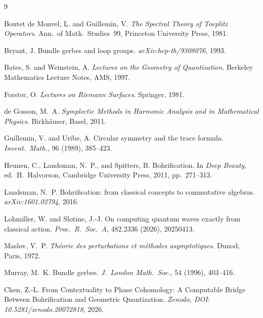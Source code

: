 \documentclass[11pt]{article}
\begin{document}
\begin{thebibliography}{9}

Boutet de Monvel, L. and Guillemin, V.
\textit{The Spectral Theory of Toeplitz Operators}.
Ann.\ of Math.\ Studies~99, Princeton University Press, 1981.

Bryant, J.
Bundle gerbes and loop groups.
\textit{arXiv:hep-th/9308076}, 1993.

Bates, S. and Weinstein, A.
\textit{Lectures on the Geometry of Quantization}.
Berkeley Mathematics Lecture Notes, AMS, 1997.

Forster, O.
\textit{Lectures on Riemann Surfaces}.
Springer, 1981.

de Gosson, M.~A.
\textit{Symplectic Methods in Harmonic Analysis and in Mathematical Physics}.
Birkh{\"a}user, Basel, 2011.

Guillemin, V. and Uribe, A.
Circular symmetry and the trace formula.
\textit{Invent.\ Math.}, 96 (1989), 385--423.

Heunen, C., Landsman, N.~P., and Spitters, B.
Bohrification.
In \textit{Deep Beauty}, ed.\ H.~Halvorson,
Cambridge University Press, 2011, pp.~271--313.

Landsman, N.~P.
Bohrification: from classical concepts to commutative algebras.
\textit{arXiv:1601.02794}, 2016.

Lohmiller, W. and Slotine, J.-J.
On computing quantum waves exactly from classical action.
\textit{Proc.\ R.\ Soc.\ A}, 482.2336 (2026), 20250413.

Maslov, V.~P.
\textit{Th\'eorie des perturbations et m\'ethodes asymptotiques}.
Dunod, Paris, 1972.

Murray, M.~K.
Bundle gerbes.
\textit{J.\ London Math.\ Soc.}, 54 (1996), 403--416.

Chen, Z.-L.
From Contextuality to Phase Cohomology:
A Computable Bridge Between Bohrification and Geometric Quantization.
\textit{Zenodo, DOI: 10.5281/zenodo.20072818}, 2026.

\end{thebibliography}
\end{document}
